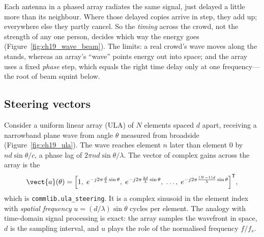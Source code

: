 
\begin{analogy}
Each antenna in a phased array radiates the same signal, just delayed a little more than its
neighbour. Where those delayed copies arrive in step, they add up; everywhere else they partly
cancel. So the \emph{timing} across the crowd, not the strength of any one person, decides which
way the energy goes (Figure~\ref{fig:ch19_wave_beam}). The limits: a real crowd's wave moves along
the stands, whereas an array's ``wave'' points energy out into space; and the array uses a fixed
\emph{phase} step, which equals the right time delay only at one frequency---the root of beam squint
below.
\end{analogy}

\subsection{Steering vectors}

Consider a uniform linear array (ULA) of $N$ elements spaced $d$ apart, receiving a narrowband plane
wave from angle $\theta$ measured from broadside (Figure~\ref{fig:ch19_ula}). The wave reaches element
$n$ later than element 0 by $nd\sin\theta/c$, a phase lag of $2\pi nd\sin\theta/\lambda$. The vector
of complex gains across the array is the 
\begin{equation}
\vect{a}(\theta)=\Big[1,\;e^{-j2\pi\frac{d}{\lambda}\sin\theta},\;e^{-j2\pi\frac{2d}{\lambda}\sin\theta},\;\dots,\;e^{-j2\pi\frac{(N-1)d}{\lambda}\sin\theta}\Big]^{\mathsf T},
\label{eq:ch19:steer}
\end{equation}
which is \texttt{commlib.ula\_steering}. It is a complex sinusoid in the element index with
\emph{spatial frequency} $u=(d/\lambda)\sin\theta$ cycles per element. The analogy with time-domain
signal processing is exact: the array samples the wavefront in space, $d$ is the sampling interval,
and $u$ plays the role of the normalised frequency $f/f_s$.

